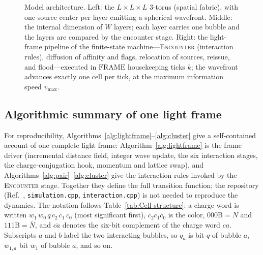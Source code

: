 \documentclass{ijuc}
\begin{document}
\begin{figure}[ht]
\caption{Model architecture. \label{fig:architecture} Left: the $L\times L\times L$ 3-torus (spatial fabric), with one source center per layer emitting a spherical wavefront.  Middle: the internal dimension of $W$ layers; each layer carries one bubble and the layers are compared by the encounter stage.  Right: the light-frame pipeline of the finite-state machine---\textsc{Encounter} (interaction rules), diffusion of affinity and flags, relocation of sources, reissue, and flood---executed in $\mathrm{FRAME}$ housekeeping ticks $k$; the wavefront advances exactly one cell per tick, at the maximum information speed $v_{\max}$.}
\end{figure}
\subsection{Algorithmic summary of one light frame}\label{subsec:algorithm}
For reproducibility, Algorithms~\ref{alg:lightframe}--\ref{alg:cluster} give a self-contained account of one complete light frame: Algorithm~\ref{alg:lightframe} is the frame driver (incremental distance field, integer wave update, the six interaction stages, the charge-conjugation hook, momentum and lattice swap), and Algorithms~\ref{alg:pair}--\ref{alg:cluster} give the interaction rules invoked by the \textsc{Encounter} stage.  Together they define the full transition function; the repository (Ref.~\cite{af_neto}, \texttt{simulation.cpp}, \texttt{interaction.cpp}) is not needed to reproduce the dynamics.  The notation follows Table~\ref{tab:Cell-structure}: a charge word is written $w_{1}\,w_{0}\,q\,c_{2}\,c_{1}\,c_{0}$ (most significant first), $c_{2}c_{1}c_{0}$ is the color, $000\mathrm{B}=N$ and $111\mathrm{B}=\bar{N}$, and $\overline{ca}$ denotes the six-bit complement of the charge word $ca$.  Subscripts $a$ and $b$ label the two interacting bubbles, so $q_a$ is bit $q$ of bubble $a$, $w_{1,a}$ bit $w_{1}$ of bubble $a$, and so on.
\end{document}
